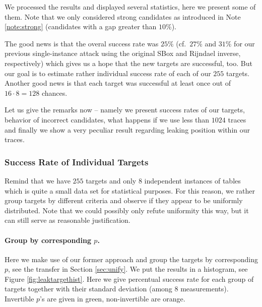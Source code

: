 We processed the results and displayed several statistics, here we present some of them. Note that we only considered strong candidates as introduced in Note \ref{note:strong} (candidates with a gap greater than $10\%$).

The good news is that the overal success rate was $25\%$ (cf.\ $27\%$ and $31\%$ for our previous single-instance attack using the original SBox and Rijndael inverse, respectively) which gives us a hope that the new targets are successful, too. But our goal is to estimate rather individual success rate of each of our $255$ targets. Another good news is that each target was successful at least once out of $16\cdot8=128$ chances.

Let us give the remarks now -- namely we present success rates of our targets, behavior of incorrect candidates, what happens if we use less than $1024$ traces and finally we show a very peculiar result regarding leaking position within our traces.

\subsubsection{Success Rate of Individual Targets}
	
	Remind that we have $255$ targets and only $8$ independent instances of tables which is quite a small data set for statistical purposes. For this reason, we rather group targets by different criteria and observe if they appear to be uniformly distributed. Note that we could possibly only refute uniformity this way, but it can still serve as reasonable justification.
	
	\paragraph{Group by corresponding $p$.}
	
	
	Here we make use of our former approach and group the targets by corresponding $p$, see the transfer in Section \ref{sec:unify}. We put the results in a histogram, see Figure \ref{fig:leaktargethist}. Here we give percentual success rate for each group of targets together with their standard deviation (among $8$ measurements). Invertible $p$'s are given in green, non-invertible are orange.
	
